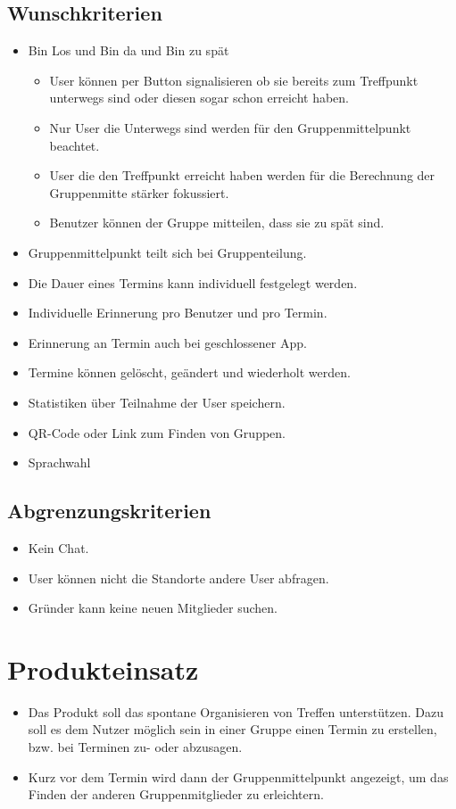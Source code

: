 \documentclass{scrartcl}
\begin{document}
	\subsection{Wunschkriterien}
	\begin{itemize}
		\item \grqq{}Bin Los\grqq{} und \grqq{}Bin da\grqq{} und \grqq{}Bin zu spät\grqq{}
		\begin{itemize}
			\item User können per Button signalisieren ob sie bereits zum Treffpunkt unterwegs sind oder diesen sogar schon erreicht haben.
			\item Nur User die Unterwegs sind werden für den Gruppenmittelpunkt beachtet.
			\item User die den Treffpunkt erreicht haben werden für die Berechnung der Gruppenmitte stärker fokussiert.
			\item Benutzer können der Gruppe mitteilen, dass sie zu spät sind.
		\end{itemize}
		\item Gruppenmittelpunkt teilt sich bei Gruppenteilung.
		\item Die Dauer eines Termins kann individuell festgelegt werden.
		\item Individuelle Erinnerung pro Benutzer und pro Termin.
		\item Erinnerung an Termin auch bei geschlossener App.
		\item Termine können gelöscht, geändert und wiederholt werden.
		\item Statistiken über Teilnahme der User speichern.
		\item QR-Code oder Link zum Finden von Gruppen.
		\item Sprachwahl
	\end{itemize}
	\subsection{Abgrenzungskriterien}
	\begin{itemize}
		\item Kein Chat.
		\item User können nicht die Standorte andere User abfragen.
		\item Gründer kann keine neuen Mitglieder suchen.
	\end{itemize}
	
	\newpage
	
	
	
	\section{Produkteinsatz}
	\begin{itemize}	        
		\item Das Produkt soll das spontane Organisieren von Treffen unterstützen. Dazu soll es dem Nutzer möglich sein in einer Gruppe einen Termin zu erstellen, bzw. bei Terminen zu- oder abzusagen.
		\item Kurz vor dem Termin wird dann der Gruppenmittelpunkt angezeigt, um das Finden der anderen Gruppenmitglieder zu erleichtern.
	\end{itemize}
\end{document}
